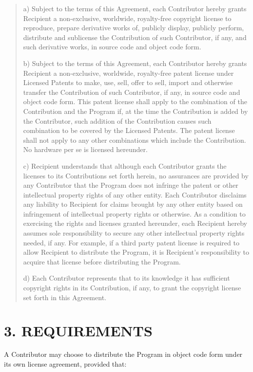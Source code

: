 \begin{quote}
a) Subject to the terms of this Agreement, each Contributor hereby grants 
Recipient a non-exclusive, worldwide, royalty-free copyright license to 
reproduce, prepare derivative works of, publicly display, publicly perform, 
distribute and sublicense the Contribution of such Contributor, if any, and 
such derivative works, in source code and object code form. 

b) Subject to the terms of this Agreement, each Contributor hereby grants
Recipient a non-exclusive, worldwide, royalty-free patent license under Licensed
Patents to make, use, sell, offer to sell, import and otherwise transfer the
Contribution of such Contributor, if any, in source code and object code form.
This patent license shall apply to the combination of the Contribution and the
Program if, at the time the Contribution is added by the Contributor, such
addition of the Contribution causes such combination to be covered by the
Licensed Patents. The patent license shall not apply to any other combinations
which include the Contribution. No hardware per se is licensed hereunder. 

c) Recipient understands that although each Contributor grants the licenses to
its Contributions set forth herein, no assurances are provided by any
Contributor that the Program does not infringe the patent or other intellectual
property rights of any other entity. Each Contributor disclaims any liability to
Recipient for claims brought by any other entity based on infringement of 
intellectual property rights or otherwise. As a condition to exercising the 
rights and licenses granted hereunder, each Recipient hereby assumes sole 
responsibility to secure any other intellectual property rights needed, if any. 
For example, if a third party patent license is required to allow Recipient to 
distribute the Program, it is Recipient's responsibility to acquire that 
license before distributing the Program. 

d) Each Contributor represents that to 
its knowledge it has sufficient copyright rights in its Contribution, if any, 
to grant the copyright license set forth in this Agreement. 
\end{quote}

\section*{3. REQUIREMENTS}

A Contributor may choose to distribute the Program in object code form under 
its own license agreement, provided that:

